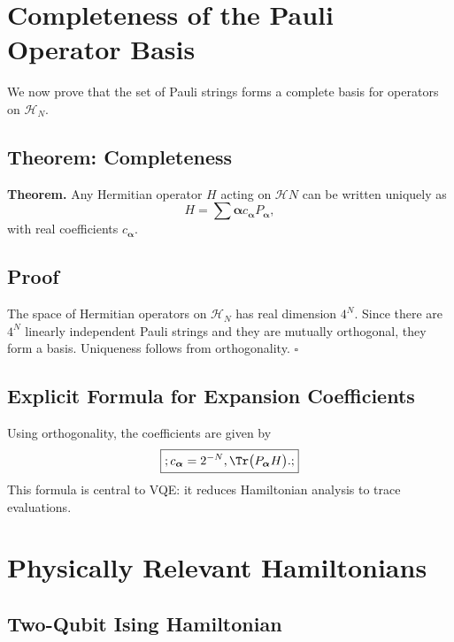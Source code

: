 \documentclass{book}
\begin{document}
\section{Completeness of the Pauli Operator Basis}

We now prove that the set of Pauli strings forms a complete basis for operators on $\mathcal{H}_N$.

\subsection{Theorem: Completeness}

\textbf{Theorem.} Any Hermitian operator $H$ acting on $\mathcal{H}N$ can be written uniquely as
\begin{equation}
H = \sum{\boldsymbol{\alpha}} c_{\boldsymbol{\alpha}} P_{\boldsymbol{\alpha}},
\end{equation}
with real coefficients $c_{\boldsymbol{\alpha}}$.

\subsection{Proof}

The space of Hermitian operators on $\mathcal{H}_N$ has real dimension $4^N$. Since there are $4^N$ linearly independent Pauli strings and they are mutually orthogonal, they form a basis. Uniqueness follows from orthogonality. \hfill $\square$

\subsection{Explicit Formula for Expansion Coefficients}

Using orthogonality, the coefficients are given by
\begin{equation}
\boxed{;c_{\boldsymbol{\alpha}} = 2^{-N} , \Tr\big(P_{\boldsymbol{\alpha}} H\big).;}
\end{equation}
This formula is central to VQE: it reduces Hamiltonian analysis to trace evaluations.

\section{Physically Relevant Hamiltonians}

\subsection{Two-Qubit Ising Hamiltonian}
\end{document}
